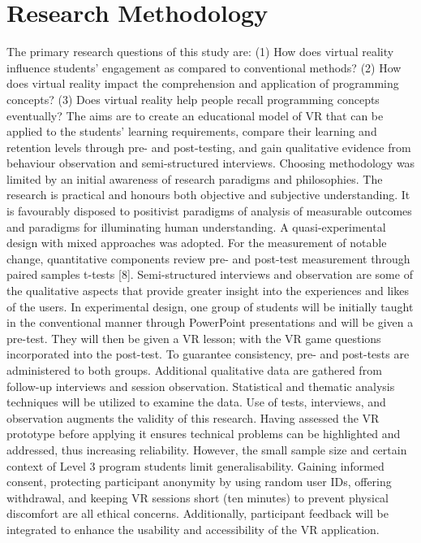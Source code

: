 \documentclass[conference]{IEEEtran}
\begin{document}
\section{Research Methodology}
The primary research questions of this study are: (1) How does virtual reality influence students' engagement as compared to conventional methods? (2) How does virtual reality impact the comprehension and application of programming concepts? (3) Does virtual reality help people recall programming concepts eventually? 
The aims are to create an educational model of VR that can be applied to the students' learning requirements, compare their learning and retention levels through pre- and post-testing, and gain qualitative evidence from behaviour observation and semi-structured interviews. Choosing methodology was limited by an initial awareness of research paradigms and philosophies. The research is practical and honours both objective and subjective understanding. It is favourably disposed to positivist paradigms of analysis of measurable outcomes and paradigms for illuminating human understanding. 
A quasi-experimental design with mixed approaches was adopted. For the measurement of notable change, quantitative components review pre- and post-test measurement through paired samples t-tests [8]. Semi-structured interviews and observation are some of the qualitative aspects that provide greater insight into the experiences and likes of the users. In experimental design, one group of students will be initially taught in the conventional manner through PowerPoint presentations and will be given a pre-test. They will then be given a VR lesson; with the VR game questions incorporated into the post-test. To guarantee consistency, pre- and post-tests are administered to both groups. Additional qualitative data are gathered from follow-up interviews and session observation. Statistical and thematic analysis techniques will be utilized to examine the data. 
Use of tests, interviews, and observation augments the validity of this research. Having assessed the VR prototype before applying it ensures technical problems can be highlighted and addressed, thus increasing reliability. However, the small sample size and certain context of Level 3 program students limit generalisability. 
Gaining informed consent, protecting participant anonymity by using random user IDs, offering withdrawal, and keeping VR sessions short (ten minutes) to prevent physical discomfort are all ethical concerns. Additionally, participant feedback will be integrated to enhance the usability and accessibility of the VR application. 
\end{document}

